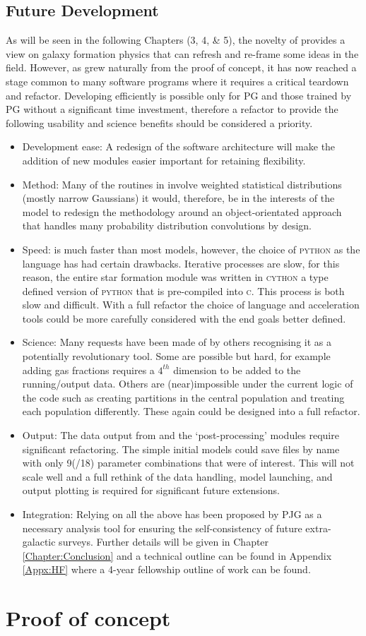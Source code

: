\subsection{Future Development}
\label{subsec:FutureDev}
As will be seen in the following Chapters (3, 4, \& 5), the novelty of \steel provides a view on galaxy formation physics that can refresh and re-frame some ideas in the field. However, as \steel grew naturally from the proof of concept, it has now reached a stage common to many software programs where it requires a critical teardown and refactor. Developing \steel efficiently is possible only for PG and those trained by PG without a significant time investment, therefore a refactor to provide the following usability and science benefits should be considered a priority. 
\begin{itemize}
    \item Development ease: A redesign of the software architecture will make the addition of new modules easier important for retaining flexibility.
    \item Method: Many of the routines in \steel involve weighted statistical distributions (mostly narrow Gaussians) it would, therefore, be in the interests of the model to redesign the methodology around an object-orientated approach that handles many probability distribution convolutions by design.
    \item Speed: \steel is much faster than most models, however, the choice of \textsc{python} as the language has had certain drawbacks. Iterative processes are slow, for this reason, the entire star formation module was written in \textsc{cython} a type defined version of \textsc{python} that is pre-compiled into \textsc{c}. This process is both slow and difficult. With a full refactor the choice of language and acceleration tools could be more carefully considered with the end goals better defined.
    \item Science: Many requests have been made of \steel by others recognising it as a potentially revolutionary tool. Some are possible but hard, for example adding gas fractions requires a $4^{th}$ dimension to be added to the running/output data. Others are (near)impossible under the current logic of the code such as creating partitions in the central population and treating each population differently. These again could be designed into a full refactor.
    \item Output: The data output from \steel and the `post-processing' modules require significant refactoring. The simple initial models could save files by name with only 9(/18) parameter combinations that were of interest. This will not scale well and a full rethink of the data handling, model launching, and output plotting is required for significant future extensions.
    \item Integration: Relying on all the above \steel has been proposed by PJG as a necessary analysis tool for ensuring the self-consistency of future extra-galactic surveys. Further details will be given in Chapter \ref{Chapter:Conclusion} and a technical outline can be found in Appendix \ref{Appx:HF} where a 4-year fellowship outline of work can be found.
\end{itemize}

\pagebreak
\section{Proof of concept}
\label{sec:Proof}
\inputminted{python}{Codes/Proof.py}
